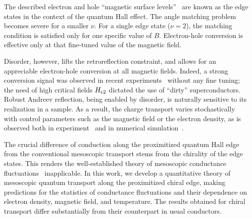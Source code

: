 \documentclass[reprint,
superscriptaddress,
amsmath,
amssymb,
aps,
prl,
floatfix,
english
]{revtex4-2}
\begin{document}
The described electron and hole ``magnetic surface levels''~\cite{nee1967} are known as the edge states in the context of the quantum Hall effect. The angle matching problem becomes severe for a smaller $\nu$.
For
a single edge state ($\nu = 2$), the matching condition is satisfied only for one specific value of $B$. Electron-hole conversion is effective only at that fine-tuned value of the magnetic field.

Disorder, however, lifts the retroreflection constraint, and allows for an appreciable electron-hole conversion at all magnetic fields.
Indeed, a strong conversion signal was observed in recent experiments~\cite{lee2017,zhao2020,gul2021,hatefipour2021} without any fine tuning; the need of high critical fields $H_{\rm c 2}$ dictated the use of ``dirty'' superconductors.
Robust Andreev reflection, being enabled by disorder, is naturally sensitive to its realization in a sample.
As a result, the charge transport varies stochastically with control parameters such as the magnetic field or the electron density, 
as is observed both in experiment~\cite{zhao2020} and in numerical simulation~\cite{manesco21}.

The crucial difference of conduction along the proximitized quantum Hall edge from the conventional mesoscopic transport stems from the chirality of the edge states.
This renders the well-established theory of mesoscopic conductance fluctuations~\cite{altshuler1985, lee1985} inapplicable.
In this work, we develop a quantitative theory of mesoscopic quantum transport along the proximitized chiral edge, making predictions for the statistics of conductance fluctuations and their dependence on electron density, magnetic field, and temperature. 
The results obtained for chiral transport differ substantially from their counterpart in usual conductors. 
\end{document}
